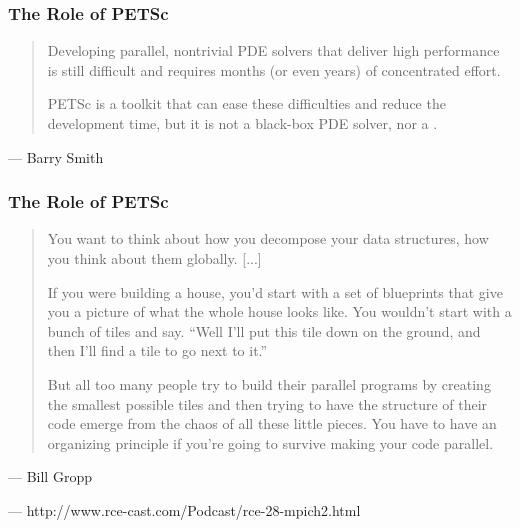 \begin{frame}[fragile]

\frametitle{The Role of PETSc}

\vspace*{\fill}
\begin{minipage}{\linewidth}
\begin{quote}
\Large Developing parallel, nontrivial PDE solvers that deliver high performance is still difficult and requires
months (or even years) of concentrated effort.

\medskip

PETSc is a toolkit that can ease these difficulties and reduce the development time, but it is not a black-box PDE
solver, nor a \color{blue}{silver bullet}.
\end{quote}
\qquad --- Barry Smith
\end{minipage}
\vspace*{\fill}\vspace*{\fill}

\end{frame}



\begin{frame}[fragile]

\frametitle{The Role of PETSc}

\vspace*{\fill}
\begin{minipage}{\linewidth}
\begin{quote}
\Large You want to think about how you decompose your data
structures, how you think about them globally. [...] 

\medskip

If you
were building a house, you'd start with a set of blueprints
that give you a picture of what the whole house looks
like. You wouldn’t start with a bunch of tiles and say.
``Well I'll put this tile down on the ground, and then I'll
find a tile to go next to it.''

\medskip

But all too many people try to
build their parallel programs by creating the smallest
possible tiles and then trying to have the structure of
their code emerge from the chaos of all these little
pieces. You have to have an organizing principle if
you're going to survive making your code parallel.

\end{quote}

\qquad --- Bill Gropp

\qquad --- http://www.rce-cast.com/Podcast/rce-28-mpich2.html
\end{minipage}
\vspace*{\fill}\vspace*{\fill}

\end{frame}
